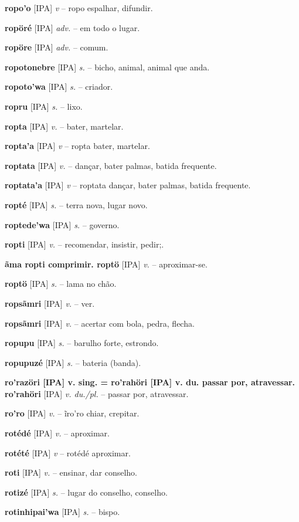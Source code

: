 \textbf{ropo'o} [IPA] \textit{v} -- ropo espalhar, difundir.

\textbf{ropöré} [IPA] \textit{adv.} -- em todo o lugar.

\textbf{ropöre} [IPA] \textit{adv.} -- comum.

\textbf{ropotonebre} [IPA] \textit{s.} -- bicho, animal, animal que anda.

\textbf{ropoto'wa} [IPA] \textit{s.} -- criador.

\textbf{ropru} [IPA] \textit{s.} -- lixo.

\textbf{ropta} [IPA] \textit{v.} -- bater, martelar.

\textbf{ropta'a} [IPA] \textit{v} -- ropta bater, martelar.

\textbf{roptata} [IPA] \textit{v.} -- dançar, bater palmas, batida frequente.

\textbf{roptata'a} [IPA] \textit{v} -- roptata dançar, bater palmas, batida frequente.

\textbf{ropté} [IPA] \textit{s.} -- terra nova, lugar novo.

\textbf{roptede'wa} [IPA] \textit{s.} -- governo.

\textbf{ropti} [IPA] \textit{v.} -- recomendar, insistir, pedir;.

\textbf{ãma ropti comprimir. roptö} [IPA] \textit{v.} -- aproximar-se.

\textbf{roptö} [IPA] \textit{s.} -- lama no chão.

\textbf{ropsãmri} [IPA] \textit{v.} -- ver.

\textbf{ropsãmri} [IPA] \textit{v.} -- acertar com bola, pedra, flecha.

\textbf{ropupu} [IPA] \textit{s.} -- barulho forte, estrondo.

\textbf{ropupuzé} [IPA] \textit{s.} -- bateria (banda).

\textbf{ro'razöri [IPA] v. sing. = ro'rahöri [IPA] v. du. passar por, atravessar. ro'rahöri} [IPA] \textit{v. du./pl.} -- passar por, atravessar.

\textbf{ro'ro} [IPA] \textit{v.} -- ĩro'ro chiar, crepitar.

\textbf{rotédé} [IPA] \textit{v.} -- aproximar.

\textbf{rotété} [IPA] \textit{v} -- rotédé aproximar.

\textbf{roti} [IPA] \textit{v.} -- ensinar, dar conselho.

\textbf{rotizé} [IPA] \textit{s.} -- lugar do conselho, conselho.

\textbf{rotinhipai'wa} [IPA] \textit{s.} -- bispo.

